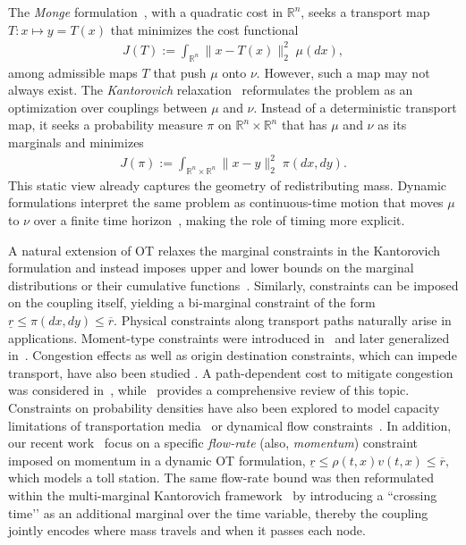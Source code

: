 \documentclass[11pt]{article}
\begin{document}
The \emph{Monge} formulation~\cite{monge1781memoire}, with a quadratic cost in $\mathbb{R}^n$, seeks a transport map $T: x \mapsto y = T(x)$ that minimizes the cost functional
\begin{align}
J(T) := \int_{\mathbb{R}^n} \|x-T(x)\|_2^2 \; \mu(dx),    
\end{align}
among admissible maps $T$ that push $\mu$ onto $\nu$. However, such a map may not always exist. The \emph{Kantorovich} relaxation~\cite{kantorovich1942translocation} reformulates the problem as an optimization over couplings between $\mu$ and $\nu$. Instead of a deterministic transport map, it seeks a probability measure $\pi$ on $\mathbb{R}^n \times \mathbb{R}^n$ that has $\mu$ and $\nu$ as its marginals and minimizes
\begin{align}
J(\pi) := \int_{\mathbb{R}^n \times \mathbb{R}^n} \|x-y\|_2^2 \; \pi(dx, dy).  
\end{align}
This static view already captures the geometry of redistributing mass. Dynamic formulations interpret the same problem as continuous-time motion that moves $\mu$ to $\nu$ over a finite time horizon~\cite{benamou2000computational}, making the role of timing more explicit.


A natural extension of OT relaxes the marginal constraints in the Kantorovich formulation and instead imposes upper and lower bounds on the marginal distributions or their cumulative functions~\cite{rachev2006mass}.
Similarly, constraints can be imposed on the coupling itself, yielding a bi-marginal constraint of the form $\underline{r} \leq \pi(dx,dy) \leq \overline{r}$.
Physical constraints along transport paths naturally arise in applications. Moment-type constraints were introduced in~\cite[Section 4.6.3]{rachev1998mass} and later generalized in~\cite{ekren2018constrained}. Congestion effects as well as origin destination constraints, which can impede transport, have also been studied \cite{haasler2020optimal,haasler2024scalable}.
 A path-dependent cost to mitigate congestion was considered in~\cite{carlier2008optimal}, while~\cite[Section 4]{santambrogio2015optimal} provides a comprehensive review of this topic. Constraints on probability densities have also been explored to model capacity limitations of transportation media~\cite{korman2013insights} or dynamical flow constraints~\cite{gladbach2022limits}. In addition, our recent work~\cite{stephanovitch2024optimal} focus on a specific \emph{flow-rate} (also, \emph{momentum}) constraint imposed on momentum in a dynamic OT formulation,
$
\underline{r} \leq \rho(t, x)v(t, x) \leq \overline{r},
$
which models a toll station. The same flow-rate bound was then reformulated within the multi-marginal Kantorovich framework~\cite{dong2024monge} by introducing a “crossing time’’ as an additional marginal over the time variable, thereby the coupling jointly encodes where mass travels and when it passes each node.
\end{document}
